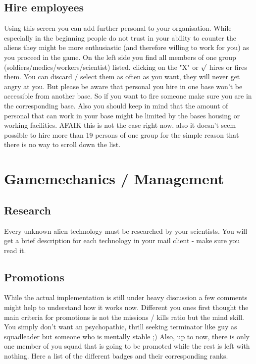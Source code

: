 \subsection{Hire employees}
Using this screen you can add further personal to your organisation. While especially in the beginning people do not trust in your ability to counter the aliens they might be more enthusiastic (and therefore willing to work for you) as you proceed in the game. On the left side you find all members of one group (soldiers/medics/workers/scientist) listed. clicking on the "X" or $\surd$ hires or fires them. You can discard / select them as often as you want, they will never get angry at you. But please be aware that personal you hire in one base won't be accessible from another base. So if you want to fire someone make sure you are in the corresponding base. Also you should keep in mind that the amount of personal that can work in your base might be limited by the bases housing or working facilities. AFAIK this is not the case right now. also it doesn't seem possible to hire more than 19 persons of one group for the simple reason that there is no way to scroll down the list.

\section{Gamemechanics / Management}
\subsection{Research}
Every unknown alien technology must be researched by your scientists. You will get a brief description for each technology in your mail client - make sure you read it.

\subsection{Promotions}
While the actual implementation is still under heavy discussion a few comments might help to understand how it works now. Different you ones first thought the main criteria for promotions is not the missions / kills ratio but the mind skill. You simply don't want an psychopathic, thrill seeking terminator like guy as squadleader but someone who is mentally stable ;) Also, up to now, there is only one member of you squad that is going to be promoted while the rest is left with nothing.
Here a list of the different badges and their corresponding ranks.

